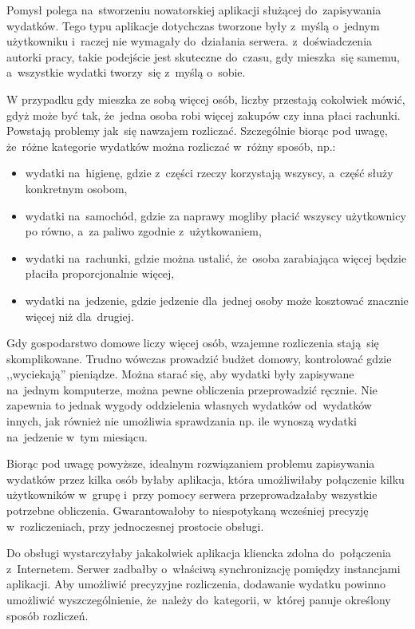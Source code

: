 \documentclass[12pt,a4paper,twoside,titlepage,openright]{book}
\begin{document}
Pomysł polega na~stworzeniu nowatorskiej aplikacji służącej do~zapisywania wydatków. Tego typu aplikacje dotychczas tworzone były z~myślą o~jednym użytkowniku i~raczej nie wymagały do~działania serwera. z~doświadczenia autorki pracy, takie podejście jest skuteczne do~czasu, gdy mieszka~się samemu, a~wszystkie wydatki tworzy~się z~myślą o~sobie. 

W przypadku gdy mieszka ze sobą więcej osób, liczby przestają cokolwiek mówić, gdyż może być tak, że~jedna osoba robi więcej zakupów czy inna płaci rachunki. Powstają problemy jak~się nawzajem rozliczać. Szczególnie biorąc pod uwagę, że~różne kategorie wydatków można rozliczać w~różny sposób, np.:
\begin{itemize}
\item wydatki na~higienę, gdzie z~części rzeczy korzystają wszyscy, a~część służy konkretnym osobom,
\item wydatki na~samochód, gdzie za naprawy mogliby płacić wszyscy użytkownicy po równo, a~za paliwo zgodnie z~użytkowaniem,
\item wydatki na~rachunki, gdzie można ustalić, że~osoba zarabiająca więcej będzie płaciła proporcjonalnie więcej,
\item wydatki na~jedzenie, gdzie jedzenie dla~jednej osoby może kosztować znacznie więcej niż dla~drugiej.
\end{itemize}
Gdy gospodarstwo domowe liczy więcej osób, wzajemne rozliczenia stają~się skomplikowane. Trudno wówczas prowadzić budżet domowy, kontrolować gdzie ,,wyciekają'' pieniądze. Można starać się, aby wydatki były zapisywane na~jednym komputerze, można pewne obliczenia przeprowadzić ręcznie. Nie zapewnia to jednak wygody oddzielenia własnych wydatków od~wydatków innych, jak również nie umożliwia sprawdzania np. ile wynoszą wydatki na~jedzenie w~tym miesiącu.

Biorąc pod uwagę powyższe, idealnym rozwiązaniem problemu zapisywania wydatków przez kilka osób byłaby aplikacja, która umożliwiłaby połączenie kilku użytkowników w~grupę i~przy pomocy serwera przeprowadzałaby wszystkie potrzebne obliczenia. Gwarantowałoby to niespotykaną wcześniej precyzję w~rozliczeniach, przy jednoczesnej prostocie obsługi. 

Do obsługi wystarczyłaby jakakolwiek aplikacja kliencka zdolna do~połączenia z~Internetem. Serwer zadbałby o~właściwą synchronizację pomiędzy instancjami aplikacji. Aby umożliwić precyzyjne rozliczenia, dodawanie wydatku powinno umożliwić wyszczególnienie, że~należy do~kategorii, w~której panuje określony sposób rozliczeń. 
\end{document}
